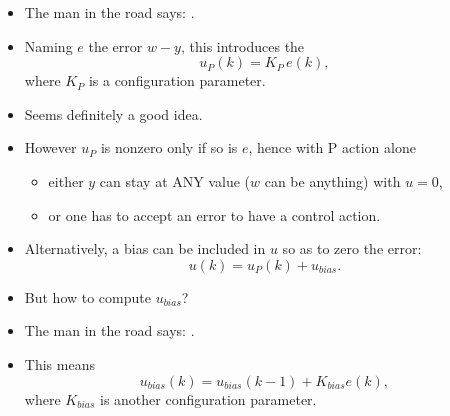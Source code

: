 \begin{frame}
\myPause
 \begin{itemize}[<+-| alert@+>]
 \item The man in the road says: .
 \item \vfill Naming $e$ the error $w-y$, this introduces the 
       \begin{displaymath}
        u_P(k) = K_P \, e(k),
       \end{displaymath}
       where $K_P$ is a configuration parameter.
 \item Seems definitely a good idea.
 \item However $u_P$ is nonzero only if so is $e$, hence with P action alone
       \begin{itemize}[<+-| alert@+>]
       \item either $y$ can stay at ANY value ($w$ can be anything) with $u=0$,
       \item or one has to accept an error to have a control action.    
       \end{itemize} 
 \end{itemize}
\end{frame}

\begin{frame}
\myPause
 \begin{itemize}[<+-| alert@+>]
 \item Alternatively, a bias can be included in $u$ so as to zero the error:
       \begin{displaymath}
        u(k) = u_P(k)+ u_{bias}.
       \end{displaymath}
 \item But how to compute $u_{bias}$?
 \item The man in the road says: .    
 \item This means
       \begin{displaymath}
        u_{bias}(k) = u_{bias}(k-1)+ K_{bias} e(k),
       \end{displaymath}
       where $K_{bias}$ is another configuration parameter.
 \end{itemize}
\end{frame}

